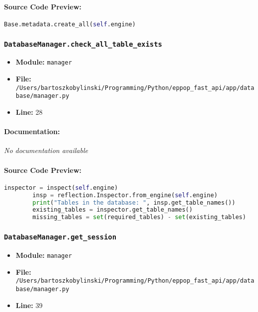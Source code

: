 \documentclass[11pt,a4paper]{article}
\begin{document}
\paragraph{Source Code Preview:}
\begin{lstlisting}[language=Python]
        Base.metadata.create_all(self.engine)
\end{lstlisting}

\vspace{1em}
\subsubsection{\texttt{DatabaseManager.check\_all\_table\_exists}}

\begin{itemize}
    \item \textbf{Module:} \texttt{manager}
    \item \textbf{File:} \texttt{/Users/bartoszkobylinski/Programming/Python/eppop\_fast\_api/app/database/manager.py}
    \item \textbf{Line:} 28
\end{itemize}

\paragraph{Documentation:} \textit{No documentation available}

\paragraph{Source Code Preview:}
\begin{lstlisting}[language=Python]
        inspector = inspect(self.engine)
        insp = reflection.Inspector.from_engine(self.engine)
        print("Tables in the database: ", insp.get_table_names())
        existing_tables = inspector.get_table_names()
        missing_tables = set(required_tables) - set(existing_tables)
\end{lstlisting}

\vspace{1em}
\subsubsection{\texttt{DatabaseManager.get\_session}}

\begin{itemize}
    \item \textbf{Module:} \texttt{manager}
    \item \textbf{File:} \texttt{/Users/bartoszkobylinski/Programming/Python/eppop\_fast\_api/app/database/manager.py}
    \item \textbf{Line:} 39
\end{itemize}
\end{document}
